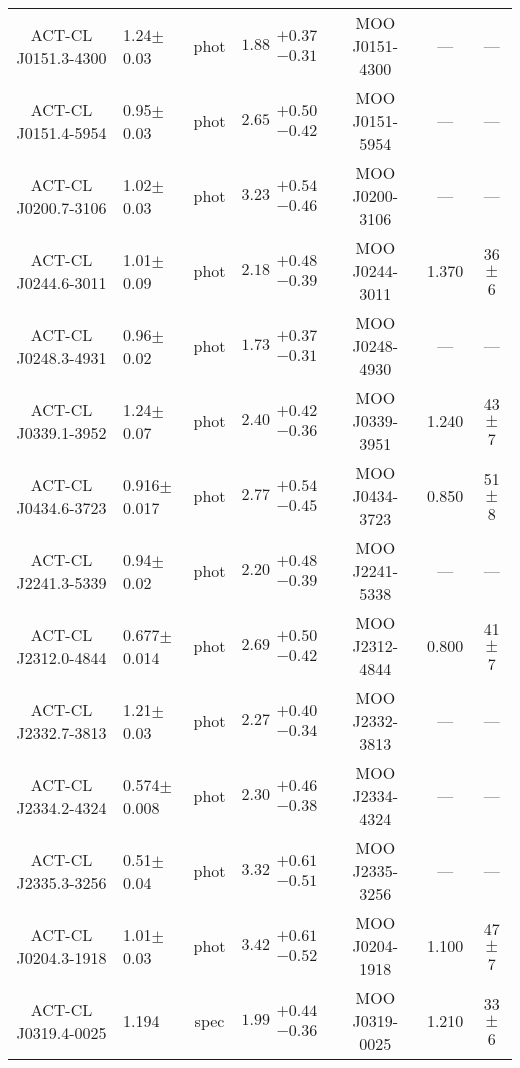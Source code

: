 \begin{longtable}[p!]{clccccc}
ACT-CL J0151.3-4300 & 1.24$\pm$ 0.03 & phot & $1.88\substack{+0.37\\-0.31}$ & MOO J0151-4300 & --- & ---\\
ACT-CL J0151.4-5954 & 0.95$\pm$ 0.03 & phot & $2.65\substack{+0.50\\-0.42}$ & MOO J0151-5954 & --- & ---\\
ACT-CL J0200.7-3106 & 1.02$\pm$ 0.03 & phot & $3.23\substack{+0.54\\-0.46}$ & MOO J0200-3106 & --- & ---\\
ACT-CL J0244.6-3011 & 1.01$\pm$ 0.09 & phot & $2.18\substack{+0.48\\-0.39}$ & MOO J0244-3011 & 1.370 & 36$\pm$ 6 \\
ACT-CL J0248.3-4931 & 0.96$\pm$ 0.02 & phot & $1.73\substack{+0.37\\-0.31}$ & MOO J0248-4930 & --- & ---\\
ACT-CL J0339.1-3952 & 1.24$\pm$ 0.07 & phot & $2.40\substack{+0.42\\-0.36}$ & MOO J0339-3951 & 1.240 & 43$\pm$ 7 \\
ACT-CL J0434.6-3723 & 0.916$\pm$ 0.017 & phot & $2.77\substack{+0.54\\-0.45}$ & MOO J0434-3723 & 0.850 & 51$\pm$ 8 \\
ACT-CL J2241.3-5339 & 0.94$\pm$ 0.02 & phot & $2.20\substack{+0.48\\-0.39}$ & MOO J2241-5338 & --- & ---\\
ACT-CL J2312.0-4844 & 0.677$\pm$ 0.014 & phot & $2.69\substack{+0.50\\-0.42}$ & MOO J2312-4844 & 0.800 & 41$\pm$ 7 \\
ACT-CL J2332.7-3813 & 1.21$\pm$ 0.03 & phot & $2.27\substack{+0.40\\-0.34}$ & MOO J2332-3813 & --- & ---\\
ACT-CL J2334.2-4324 & 0.574$\pm$ 0.008 & phot & $2.30\substack{+0.46\\-0.38}$ & MOO J2334-4324 & --- & ---\\
ACT-CL J2335.3-3256 & 0.51$\pm$ 0.04 & phot & $3.32\substack{+0.61\\-0.51}$ & MOO J2335-3256 & --- & ---\\
ACT-CL J0204.3-1918 & 1.01$\pm$ 0.03 & phot & $3.42\substack{+0.61\\-0.52}$ & MOO J0204-1918 & 1.100 & 47$\pm$ 7 \\
ACT-CL J0319.4-0025 & 1.194& spec & $1.99\substack{+0.44\\-0.36}$ & MOO J0319-0025 & 1.210 & 33$\pm$ 6 \\

\end{longtable}
